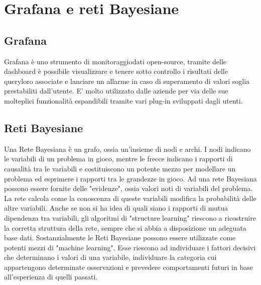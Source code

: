 \section{Grafana e reti Bayesiane}
		\subsection{Grafana}			
Grafana è uno strumento di monitoraggio\pedice dati open-source, tramite delle dashboard è possibile visualizzare e tenere sotto controllo i risultati delle query\pedice loro associate e lanciare un allarme in caso di superamento di valori soglia prestabiliti dall'utente. E' molto utilizzato dalle aziende per via delle sue molteplici funzionalità  espandibili tramite vari plug-in sviluppati dagli utenti.


		\subsection{Reti Bayesiane}
Una Rete Bayesiana è un grafo, ossia un'insieme di nodi e archi. I nodi
indicano le variabili di un problema in gioco, mentre le frecce indicano i
rapporti di causalità tra le variabili e costituiscono un potente mezzo per
modellare un problema ed esprimere i rapporti tra le grandezze in gioco.
Ad una rete Bayesiana possono essere fornite delle "evidenze", ossia valori noti di variabili del problema. 
La rete calcola come la conoscenza di queste variabili modifica la probabilità  delle altre variabili.
Anche se non si ha idea di quali siano i rapporti di mutua dipendenza tra
variabili, gli algoritmi di "structure learning" riescono a ricostruire la corretta struttura della rete, sempre che si abbia a disposizione un adeguata base dati.
Sostanzialmente le Reti Bayesiane possono essere utilizzate come potenti mezzi
di "machine learning\pedice". Esse riescono ad individuare i fattori decisivi che
determinano i valori di una variabile, individuare la categoria cui appartengono determinate osservazioni e prevedere comportamenti futuri in base all'esperienza di quelli passati.


\newpage

